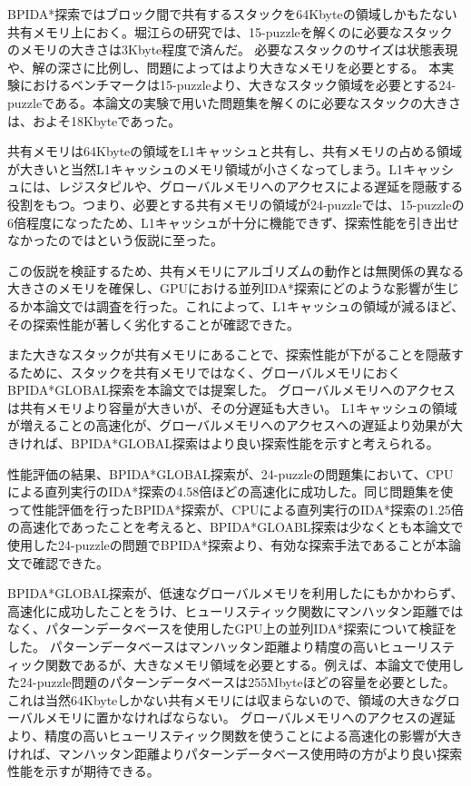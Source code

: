 \documentclass[a4paper,11pt,oneside,openany]{jsbook}
\begin{document}
BPIDA*探索ではブロック間で共有するスタックを64Kbyteの領域しかもたない共有メモリ上におく。堀江らの研究では、15-puzzleを解くのに必要なスタックのメモリの大きさは3Kbyte程度で済んだ。
必要なスタックのサイズは状態表現や、解の深さに比例し、問題によってはより大きなメモリを必要とする。
本実験におけるベンチマークは15-puzzleより、大きなスタック領域を必要とする24-puzzleである。本論文の実験で用いた問題集を解くのに必要なスタックの大きさは、およそ18Kbyteであった。

共有メモリは64Kbyteの領域をL1キャッシュと共有し、共有メモリの占める領域が大きいと当然L1キャッシュのメモリ領域が小さくなってしまう。L1キャッシュには、レジスタピルや、グローバルメモリへのアクセスによる遅延を隠蔽する役割をもつ。つまり、必要とする共有メモリの領域が24-puzzleでは、15-puzzleの6倍程度になったため、L1キャッシュが十分に機能できず、探索性能を引き出せなかったのではという仮説に至った。

この仮説を検証するため、共有メモリにアルゴリズムの動作とは無関係の異なる大きさのメモリを確保し、GPUにおける並列IDA*探索にどのような影響が生じるか本論文では調査を行った。これによって、L1キャッシュの領域が減るほど、その探索性能が著しく劣化することが確認できた。

また大きなスタックが共有メモリにあることで、探索性能が下がることを隠蔽するために、スタックを共有メモリではなく、グローバルメモリにおくBPIDA*GLOBAL探索を本論文では提案した。
グローバルメモリへのアクセスは共有メモリより容量が大きいが、その分遅延も大きい。
L1キャッシュの領域が増えることの高速化が、グローバルメモリへのアクセスへの遅延より効果が大きければ、BPIDA*GLOBAL探索はより良い探索性能を示すと考えられる。

性能評価の結果、BPIDA*GLOBAL探索が、24-puzzleの問題集において、CPUによる直列実行のIDA*探索の4.58倍ほどの高速化に成功した。同じ問題集を使って性能評価を行ったBPIDA*探索が、CPUによる直列実行のIDA*探索の1.25倍の高速化であったことを考えると、BPIDA*GLOABL探索は少なくとも本論文で使用した24-puzzleの問題でBPIDA*探索より、有効な探索手法であることが本論文で確認できた。

BPIDA*GLOBAL探索が、低速なグローバルメモリを利用したにもかかわらず、高速化に成功したことをうけ、ヒューリスティック関数にマンハッタン距離ではなく、パターンデータベースを使用したGPU上の並列IDA*探索について検証をした。
パターンデータベースはマンハッタン距離より精度の高いヒューリスティック関数であるが、大きなメモリ領域を必要とする。例えば、本論文で使用した24-puzzle問題のパターンデータベースは255Mbyteほどの容量を必要とした。
これは当然64Kbyteしかない共有メモリには収まらないので、領域の大きなグローバルメモリに置かなければならない。
グローバルメモリへのアクセスの遅延より、精度の高いヒューリスティック関数を使うことによる高速化の影響が大きければ、マンハッタン距離よりパターンデータベース使用時の方がより良い探索性能を示すが期待できる。
\end{document}
